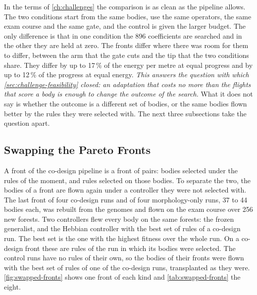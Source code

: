 In the terms of \autoref{ch:challenges} the comparison is as clean as the pipeline allows. The two conditions start from the same bodies, use the same operators, the same exam course and the same gate, and the control is given the larger budget. The only difference is that in one condition the 896 coefficients are searched and in the other they are held at zero. The fronts differ where there was room for them to differ, between the arm that the gate cuts and the tip that the two conditions share. They differ by up to 17\,\% of the energy per metre at equal progress and by up to 12\,\% of the progress at equal energy. \emph{This answers the question with which \autoref{sec:challenge-feasibility} closed: an adaptation that costs no more than the flights that score a body is enough to change the outcome of the search.} What it does not say is whether the outcome is a different set of bodies, or the same bodies flown better by the rules they were selected with. The next three subsections take the question apart.

\subsection{Swapping the Pareto Fronts}
\label{subsec:results-swapped-fronts}

A front of the co-design pipeline is a front of pairs: bodies selected under the rules of the moment, and rules selected on those bodies. To separate the two, the bodies of a front are flown again under a controller they were not selected with. The last front of four co-design runs and of four morphology-only runs, 37 to 44 bodies each, was rebuilt from the genomes and flown on the exam course over 256 new forests. Two controllers flew every body on the same forests: the frozen generalist, and the Hebbian controller with the best set of rules of a co-design run. The best set is the one with the highest fitness over the whole run. On a co-design front these are rules of the run in which its bodies were selected. The control runs have no rules of their own, so the bodies of their fronts were flown with the best set of rules of one of the co-design runs, transplanted as they were. \autoref{fig:swapped-fronts} shows one front of each kind and \autoref{tab:swapped-fronts} the eight.


